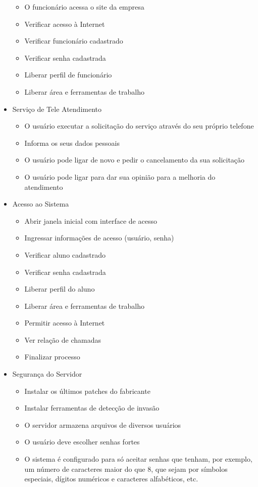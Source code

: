 \begin{itemize}
\begin{itemize}
	\item O funcionário acessa o site da empresa
	\item Verificar acesso à Internet
	\item Verificar funcionário cadastrado 
	\item Verificar senha cadastrada 
	\item Liberar perfil de funcionário 
	\item Liberar área e ferramentas de trabalho
	\end{itemize}
\item Serviço de Tele Atendimento
	\begin{itemize}
	\item O usuário executar a solicitação do serviço através do seu próprio telefone
	\item Informa os seus dados pessoais
	\item O usuário pode ligar de novo e pedir o cancelamento da sua solicitação
	\item O usuário pode ligar para dar sua opinião para a melhoria do atendimento
	\end{itemize}
\item Acesso ao Sistema
	\begin{itemize}
	\item Abrir janela inicial com interface de acesso 
	\item Ingressar informações de acesso (usuário, senha) 
	\item Verificar aluno cadastrado 
	\item Verificar senha cadastrada 
	\item Liberar perfil do aluno 
	\item Liberar área e ferramentas de trabalho 
	\item Permitir acesso à Internet 
	\item Ver relação de chamadas
	\item Finalizar processo
	\end{itemize}
\item Segurança do Servidor
	\begin{itemize}
	\item Instalar os últimos patches do fabricante
	\item Instalar ferramentas de detecção de invasão
	\item O servidor armazena arquivos de diversos usuários
	\item O usuário deve escolher senhas fortes
	\item O sistema é configurado para só aceitar senhas que tenham, por exemplo, um número de caracteres maior do que 8, que sejam por símbolos especiais, dígitos numéricos e caracteres alfabéticos, etc.

\end{itemize}
\end{itemize}
